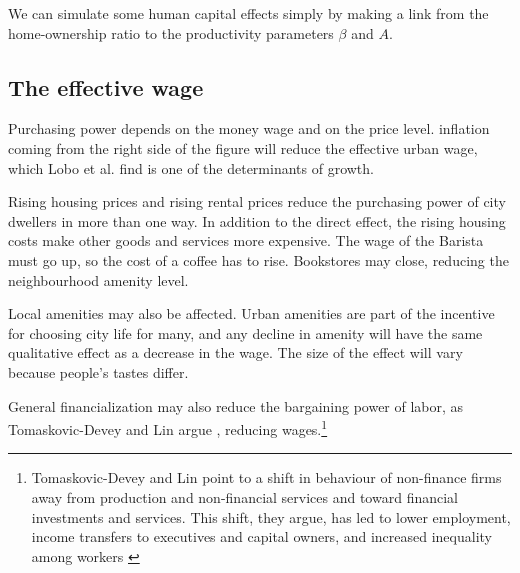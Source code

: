We can simulate some human capital effects simply by making a link from the home-ownership ratio to the productivity parameters  $\beta$ and $A$. 



\subsection{The effective wage}

Purchasing power depends on the money wage and on the price level. inflation coming from the right side of the figure will reduce the effective urban wage, which Lobo et al. find is one of the determinants of growth. 

 Rising housing prices and rising rental prices reduce the purchasing power of city dwellers in more than one way. In addition to the direct effect, the rising housing costs make other goods and services more expensive. The wage of the Barista must go up, so the cost of a coffee has to rise. Bookstores may close, reducing the neighbourhood amenity level. 
 
 Local amenities may also be affected. Urban amenities  are part of the incentive for choosing city life for many, and any decline in amenity will have the same qualitative effect as a decrease in the wage. The size of the effect will vary because people's tastes differ. 


 General financialization may also reduce the bargaining power of labor, as Tomaskovic-Devey and Lin argue \cite{tomaskovic-deveyFinancializationCausesInequality2013}, reducing wages.\footnote{Tomaskovic-Devey and Lin point to a shift in behaviour of non-finance firms away from production and non-financial services and toward financial investments and services. This shift, they argue,  has led to lower employment, income transfers to executives and capital owners, and increased inequality among workers \cite{tomaskovic-deveyFinancializationCausesInequality2013}}


